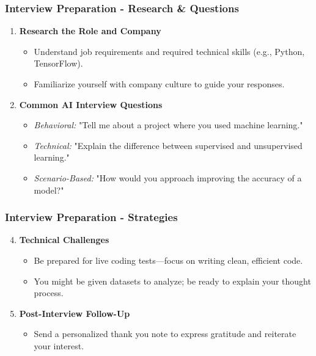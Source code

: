 \documentclass{beamer}
\begin{document}
\begin{frame}[fragile]
    \frametitle{Interview Preparation - Research & Questions}
    \begin{enumerate}
        \item \textbf{Research the Role and Company}
        \begin{itemize}
            \item Understand job requirements and required technical skills (e.g., Python, TensorFlow).
            \item Familiarize yourself with company culture to guide your responses.
        \end{itemize}
        
        \item \textbf{Common AI Interview Questions}
        \begin{itemize}
            \item \textit{Behavioral:} "Tell me about a project where you used machine learning."
            \item \textit{Technical:} "Explain the difference between supervised and unsupervised learning."
            \item \textit{Scenario-Based:} "How would you approach improving the accuracy of a model?"
        \end{itemize}
    \end{enumerate}
\end{frame}

\begin{frame}[fragile]
    \frametitle{Interview Preparation - Strategies}
    \begin{enumerate}
        \setcounter{enumi}{3}
        \item \textbf{Technical Challenges}
        \begin{itemize}
            \item Be prepared for live coding tests—focus on writing clean, efficient code.
            \item You might be given datasets to analyze; be ready to explain your thought process.
        \end{itemize}
        
        \item \textbf{Post-Interview Follow-Up}
        \begin{itemize}
            \item Send a personalized thank you note to express gratitude and reiterate your interest.
        \end{itemize}
    \end{enumerate}
\end{frame}
\end{document}
